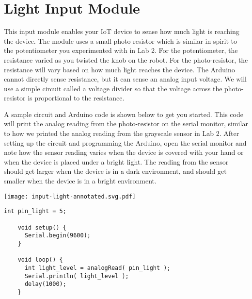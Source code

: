 
\section{Light Input Module}
\label{sec-input-light}

This input module enables your IoT device to sense how much light is
reaching the device. The module uses a small photo-resistor which is
similar in spirit to the potentiometer you experimented with in Lab 2.
For the potentiometer, the resistance varied as you twisted the knob on
the robot. For the photo-resistor, the resistance will vary based on how
much light reaches the device. The Arduino cannot directly sense
resistance, but it can sense an analog input voltage. We will use a
simple circuit called a voltage divider so that the voltage across the
photo-resistor is proportional to the resistance.

A sample circuit and Arduino code is shown below to get you started. This
code will print the analog reading from the photo-resistor on the serial
monitor, similar to how we printed the analog reading from the grayscale
sensor in Lab 2. After setting up the circuit and programming the
Arduino, open the serial monitor and note how the sensor reading varies
when the device is covered with your hand or when the device is placed
under a bright light. The reading from the sensor should get larger when
the device is in a dark environment, and should get smaller when the
device is in a bright environment.

\vspace{0.1in}
\begin{minipage}[t]{0.49\tw}
  \vspace{0pt}

  \texttt{[image: input-light-annotated.svg.pdf]}
\end{minipage}
\hfill
\begin{minipage}[t]{0.49\tw}
  \vspace{0.1in}
  \begin{Verbatim}[gobble=3,fontsize=\small]
    int pin_light = 5;

    void setup() {
      Serial.begin(9600);
    }

    void loop() {
      int light_level = analogRead( pin_light );
      Serial.println( light_level );
      delay(1000);
    }
  \end{Verbatim}
\end{minipage}

